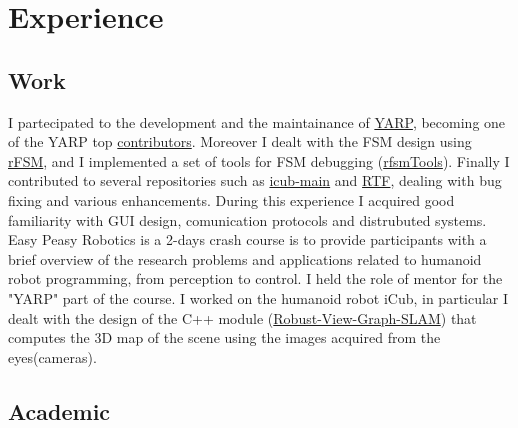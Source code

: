 \documentclass[10pt,a4paper]{moderncv}
\begin{document}
\section{Experience}
\subsection{Work}
{
I partecipated to the development and the maintainance of \href{https://github.com/robotology/yarp}{YARP}, becoming one of the YARP top \href{https://github.com/robotology/yarp/graphs/contributors}{contributors}.
Moreover I dealt with the FSM design using \href{https://people.mech.kuleuven.be/~bruyninc/rFSM/doc/README.html}{rFSM}, and I implemented a set of tools for FSM debugging (\href{https://robotology.github.io/rfsmTools/}{rfsmTools}).
Finally I contributed to several repositories such as \href{https://github.com/robotology/icub-main}{icub-main} and \href{https://github.com/robotology/robot-testing}{RTF}, dealing with bug fixing and various enhancements. During this experience I acquired good familiarity with GUI design, comunication protocols and distrubuted systems.}
{Easy Peasy Robotics is a 2-days crash course is to provide participants with a brief overview of the research problems and applications related to humanoid robot programming, from perception to control.
I held the role of mentor for the "YARP" part of the course.
}
{I worked on the humanoid robot iCub, in particular I dealt with the design of the C++ module (\href{https://github.com/robotology-playground/Robust-View-Graph-SLAM}{Robust-View-Graph-SLAM}) that computes the 3D map of the scene using the images acquired from the eyes(cameras).}
\subsection{Academic}
\end{document}
